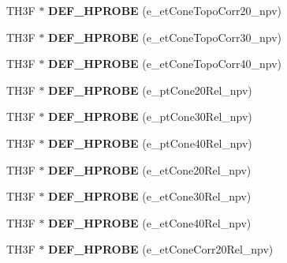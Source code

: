 \begin{DoxyCompactItemize}
\item 
\hypertarget{classHistos__Fake_a5934c4fae9ba8091568ddd0e16268507}{
TH3F $\ast$ {\bfseries DEF\_\-HPROBE} (e\_\-etConeTopoCorr20\_\-npv)}
\label{classHistos__Fake_a5934c4fae9ba8091568ddd0e16268507}

\item 
\hypertarget{classHistos__Fake_aa110053061b4ae631eae402c69809887}{
TH3F $\ast$ {\bfseries DEF\_\-HPROBE} (e\_\-etConeTopoCorr30\_\-npv)}
\label{classHistos__Fake_aa110053061b4ae631eae402c69809887}

\item 
\hypertarget{classHistos__Fake_a6fbed4226c30ea6c7cd056eca86c6966}{
TH3F $\ast$ {\bfseries DEF\_\-HPROBE} (e\_\-etConeTopoCorr40\_\-npv)}
\label{classHistos__Fake_a6fbed4226c30ea6c7cd056eca86c6966}

\item 
\hypertarget{classHistos__Fake_af6c4481b93e5fc940fb6a71a6af31276}{
TH3F $\ast$ {\bfseries DEF\_\-HPROBE} (e\_\-ptCone20Rel\_\-npv)}
\label{classHistos__Fake_af6c4481b93e5fc940fb6a71a6af31276}

\item 
\hypertarget{classHistos__Fake_a1175e3a63571cebf61a09c1c1f37dc10}{
TH3F $\ast$ {\bfseries DEF\_\-HPROBE} (e\_\-ptCone30Rel\_\-npv)}
\label{classHistos__Fake_a1175e3a63571cebf61a09c1c1f37dc10}

\item 
\hypertarget{classHistos__Fake_a6fb26ef07376113ad6d262f607b3c23d}{
TH3F $\ast$ {\bfseries DEF\_\-HPROBE} (e\_\-ptCone40Rel\_\-npv)}
\label{classHistos__Fake_a6fb26ef07376113ad6d262f607b3c23d}

\item 
\hypertarget{classHistos__Fake_afc547d5e97cea624ab60ab53a26d02a8}{
TH3F $\ast$ {\bfseries DEF\_\-HPROBE} (e\_\-etCone20Rel\_\-npv)}
\label{classHistos__Fake_afc547d5e97cea624ab60ab53a26d02a8}

\item 
\hypertarget{classHistos__Fake_a54887916e96fba114561f48d7168ca3a}{
TH3F $\ast$ {\bfseries DEF\_\-HPROBE} (e\_\-etCone30Rel\_\-npv)}
\label{classHistos__Fake_a54887916e96fba114561f48d7168ca3a}

\item 
\hypertarget{classHistos__Fake_aedd25a96e0085eb33fc7f3a8f73cc947}{
TH3F $\ast$ {\bfseries DEF\_\-HPROBE} (e\_\-etCone40Rel\_\-npv)}
\label{classHistos__Fake_aedd25a96e0085eb33fc7f3a8f73cc947}

\item 
\hypertarget{classHistos__Fake_a9fc932df42dc3df68cfd54fbebbefbb3}{
TH3F $\ast$ {\bfseries DEF\_\-HPROBE} (e\_\-etConeCorr20Rel\_\-npv)}
\label{classHistos__Fake_a9fc932df42dc3df68cfd54fbebbefbb3}


\end{DoxyCompactItemize}
